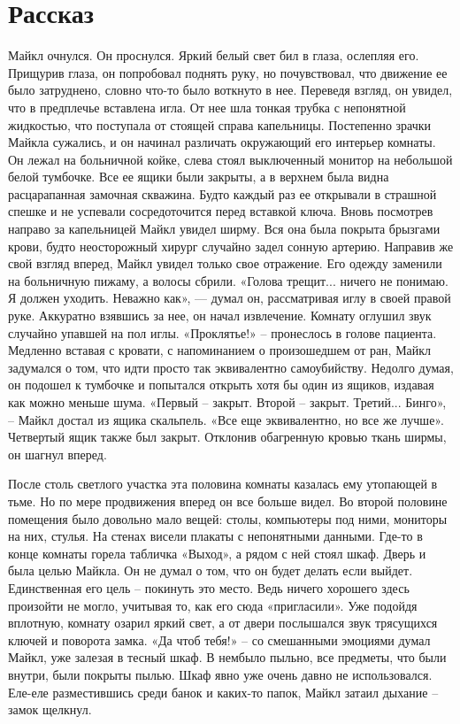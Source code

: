 \chapter{Рассказ}
\lettrine{М}{}айкл очнулся. Он проснулся. Яркий белый свет бил в глаза, ослепляя его. Прищурив глаза, он попробовал поднять руку, но почувствовал, что движение ее было затруднено, словно что-то было воткнуто в нее. Переведя взгляд, он увидел, что в предплечье вставлена игла. От нее шла тонкая трубка с непонятной жидкостью, что поступала от стоящей справа капельницы. Постепенно зрачки Майкла сужались, и он начинал различать окружающий его интерьер комнаты. Он лежал на больничной койке, слева стоял выключенный монитор на небольшой белой тумбочке. Все ее ящики были закрыты, а в верхнем была видна расцарапанная замочная скважина. Будто каждый раз ее открывали в страшной спешке и не успевали сосредоточится перед вставкой ключа. Вновь посмотрев направо за капельницей Майкл увидел ширму. Вся она была покрыта брызгами крови, будто неосторожный хирург случайно задел сонную артерию. Направив же свой взгляд вперед, Майкл увидел только свое отражение. Его одежду заменили на больничную пижаму, а волосы сбрили. «Голова трещит... ничего не понимаю. Я должен уходить. Неважно как», — думал он, рассматривая иглу в своей правой руке. Аккуратно взявшись за нее, он начал извлечение. Комнату оглушил звук случайно упавшей на пол иглы. «Проклятье!» – пронеслось в голове пациента. Медленно вставая с кровати, с напоминанием о произошедшем от ран, Майкл задумался о том, что идти просто так эквивалентно самоубийству. Недолго думая, он подошел к тумбочке и попытался открыть хотя бы один из ящиков, издавая как можно меньше шума. «Первый – закрыт. Второй – закрыт. Третий... Бинго», – Майкл достал из ящика скальпель. «Все еще эквивалентно, но все же лучше». Четвертый ящик также был закрыт. Отклонив обагренную кровью ткань ширмы, он шагнул вперед.

После столь светлого участка эта половина комнаты казалась ему утопающей в тьме. Но по мере продвижения вперед он все больше видел. Во второй половине помещения было довольно мало вещей: столы, компьютеры под ними, мониторы на них, стулья. На стенах висели плакаты с непонятными данными. Где-то в конце комнаты горела табличка «Выход», а рядом с ней стоял шкаф. Дверь и была целью Майкла. Он не думал о том, что он будет делать если выйдет. Единственная его цель – покинуть это место. Ведь ничего хорошего здесь произойти не могло, учитывая то, как его сюда «пригласили». Уже подойдя вплотную, комнату озарил яркий свет, а от двери послышался звук трясущихся ключей и поворота замка. «Да чтоб тебя!» – со смешанными эмоциями думал Майкл, уже залезая в тесный шкаф. В нембыло пыльно, все предметы, что были внутри, были покрыты пылью. Шкаф явно уже очень давно не использовался. Еле-еле разместившись среди банок и каких-то папок, Майкл затаил дыхание – замок щелкнул. 


